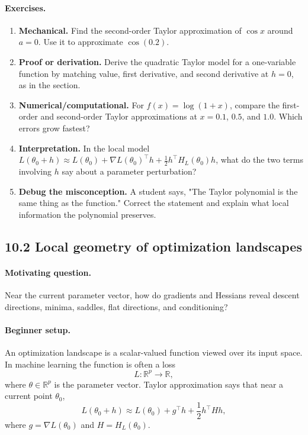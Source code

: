 \paragraph{Exercises.}
\begin{enumerate}[label=\textbf{10.1.\arabic*.}, leftmargin=*]
\item \textbf{Mechanical.} Find the second-order Taylor approximation of \(\cos x\) around \(a=0\). Use it to approximate \(\cos(0.2)\).
\item \textbf{Proof or derivation.} Derive the quadratic Taylor model for a one-variable function by matching value, first derivative, and second derivative at \(h=0\), as in the section.
\item \textbf{Numerical/computational.} For \(f(x)=\log(1+x)\), compare the first-order and second-order Taylor approximations at \(x=0.1\), \(0.5\), and \(1.0\). Which errors grow fastest?
\item \textbf{Interpretation.} In the local model \(L(\theta_0+h)\approx L(\theta_0)+\nabla L(\theta_0)^\top h+\frac{1}{2}h^\top H_L(\theta_0)h\), what do the two terms involving \(h\) say about a parameter perturbation?
\item \textbf{Debug the misconception.} A student says, "The Taylor polynomial is the same thing as the function." Correct the statement and explain what local information the polynomial preserves.
\end{enumerate}

\subsection{10.2 Local geometry of optimization landscapes}

\paragraph{Motivating question.}
Near the current parameter vector, how do gradients and Hessians reveal descent directions, minima, saddles, flat directions, and conditioning?

\paragraph{Beginner setup.}
An optimization landscape is a scalar-valued function viewed over its input space. In machine learning the function is often a loss
\[
L:\mathbb{R}^p\to\mathbb{R},
\]
where \(\theta\in\mathbb{R}^p\) is the parameter vector. Taylor approximation says that near a current point \(\theta_0\),
\[
L(\theta_0+h)\approx
L(\theta_0)+g^\top h+\frac{1}{2}h^\top Hh,
\]
where \(g=\nabla L(\theta_0)\) and \(H=H_L(\theta_0)\).

